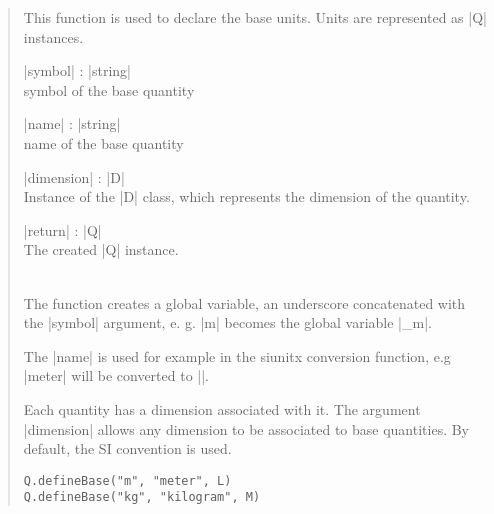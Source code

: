 \documentclass{ltxdoc}
\begin{document}
\begin{quote}
  This function is used to declare the base units. Units are represented as |Q| instances.  

  \subtitle{Parameters}
  \begin{description}
  \item |symbol| : |string|\\
    symbol of the base quantity

  \item |name| : |string|\\
    name of the base quantity

  \item |dimension| : |D|\\
    Instance of the |D| class, which represents the dimension of the quantity.

  \item |return| : |Q|\\
    The created |Q| instance.
  \end{description}

  \subtitle{Note}\\
  The function creates a global variable, an underscore concatenated with the |symbol| argument, e. g. |m| becomes the global variable |_m|.

  The |name| is used for example in the siunitx conversion function, e.g |meter| will be converted to |\meter|. 

  Each quantity has a dimension associated with it. The argument |dimension| allows any dimension to be associated to base quantities. By default, the SI convention is used. 

  \subtitle{Example}
  \begin{lstlisting}
Q.defineBase("m", "meter", L)
Q.defineBase("kg", "kilogram", M)
  \end{lstlisting}
\end{quote}
\end{document}
